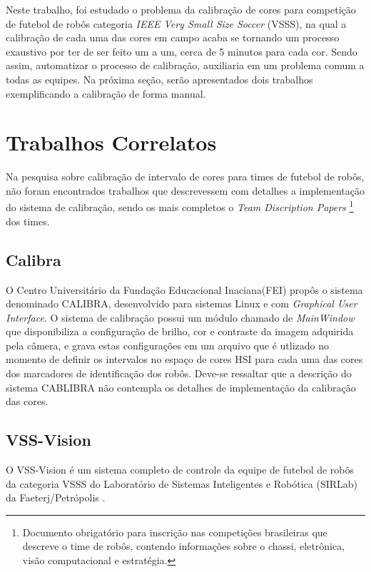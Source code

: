Neste trabalho, foi estudado o problema da calibração de cores para competição de futebol de robôs categoria {\it IEEE Very Small Size Soccer} (VSSS), na qual a calibração de cada uma das cores em campo acaba se tornando um processo exaustivo por ter de ser feito um a um, cerca de 5 minutos para cada cor. Sendo assim, automatizar o processo de calibração, auxiliaria em um problema comum a todas as equipes. Na próxima seção, serão apresentados dois trabalhos exemplificando a calibração de forma manual.  

\section{Trabalhos Correlatos}
Na pesquisa sobre calibração de intervalo de cores para times de futebol de robôs, não foram encontrados trabalhos que descrevessem com detalhes a implementação do sistema de calibração, sendo os mais completos o {\it Team Discription Papers}
\footnote{Documento obrigatório para inscrição nas competições brasileiras que descreve o time de robôs, contendo informações sobre o chassi, eletrônica, visão computacional e estratégia.} 
dos times.

\subsection{Calibra}
O Centro Universitário da Fundação Educacional Inaciana(FEI) propôs o sistema denominado CALIBRA, desenvolvido para sistemas Linux e com {\it Graphical User Interface}. O sistema de calibração possui um módulo chamado de {\it MainWindow} que disponibiliza a configuração de brilho, cor e contraste da imagem adquirida pela câmera, e grava estas configurações em um arquivo que é utlizado no momento de definir os intervalos no espaço de cores HSI para cada uma das cores dos marcadores de identificação dos robôs\cite{Penharbel:2004,PenharbelTime}. Deve-se ressaltar que a descrição do sistema CABLIBRA não contempla os detalhes de implementação da calibração das cores.

\subsection{VSS-Vision}

O VSS-Vision é um sistema completo de controle da equipe de futebol de robôs da categoria VSSS do Laboratório de Sistemas Inteligentes e Robótica (SIRLab) da Faeterj/Petrópolis  \cite{Rosa:2015}. %

